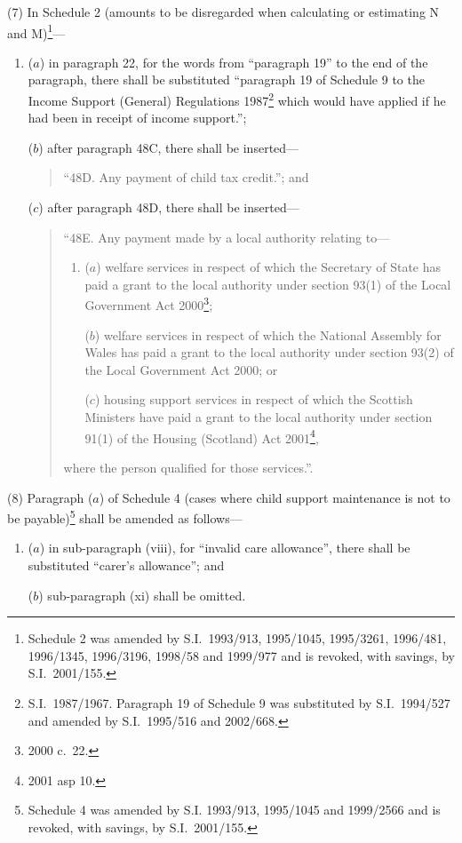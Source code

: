 \documentclass[12pt,a4paper]{article}
\begin{document}
(7) In Schedule 2 (amounts to be disregarded when calculating or estimating N and M)\footnote{Schedule 2 was amended by S.I.\ 1993/913, 1995/1045, 1995/3261, 1996/481, 1996/1345, 1996/3196, 1998/58 and 1999/977 and is revoked, with savings, by S.I.\ 2001/155.}—
\begin{enumerate}\item[]
($a$) in paragraph 22, for the words from “paragraph 19” to the end of the paragraph, there shall be substituted “paragraph 19 of Schedule 9 to the Income Support (General) Regulations 1987\footnote{S.I.\ 1987/1967. Paragraph 19 of Schedule 9 was substituted by S.I.\ 1994/527 and amended by S.I.\ 1995/516 and 2002/668.} which would have applied if he had been in receipt of income support.”;

($b$) after paragraph 48C, there shall be inserted—
\begin{quotation}
“48D.  Any payment of child tax credit.”; and
\end{quotation}

($c$) after paragraph 48D, there shall be inserted—
\begin{quotation}
“48E.  Any payment made by a local authority relating to—
\begin{enumerate}\item[]
($a$) welfare services in respect of which the Secretary of State has paid a grant to the local authority under section 93(1) of the Local Government Act 2000\footnote{2000 c.\ 22.};

($b$) welfare services in respect of which the National Assembly for Wales has paid a grant to the local authority under section 93(2) of the Local Government Act 2000; or

($c$) housing support services in respect of which the Scottish Ministers have paid a grant to the local authority under section 91(1) of the Housing (Scotland) Act 2001\footnote{2001 asp 10.},
\end{enumerate}
where the person qualified for those services.”.
\end{quotation}
\end{enumerate}

(8) Paragraph ($a$)  of Schedule 4 (cases where child support maintenance is not to be payable)\footnote{Schedule 4 was amended by S.I. 1993/913, 1995/1045 and 1999/2566 and is revoked, with savings, by S.I.\ 2001/155.} shall be amended as follows—
\begin{enumerate}\item[]
($a$) in sub-paragraph (viii), for “invalid care allowance”, there shall be substituted “carer’s allowance”; and

($b$) sub-paragraph (xi) shall be omitted.
\end{enumerate}
\end{document}
